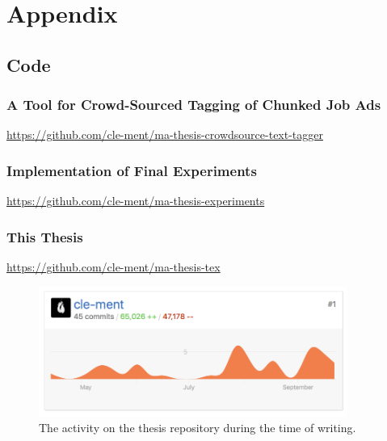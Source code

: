 
\renewcommand{\theequation}{B\arabic{equation}}
\setcounter{equation}{0}
\renewcommand{\thefigure}{B\arabic{figure}}
\setcounter{figure}{0}
\renewcommand{\thetable}{B\arabic{table}}
\setcounter{table}{0}


\clearpage

\thesisappendix

\section{Appendix}

\subsection{Code}

\subsubsection*{A Tool for Crowd-Sourced Tagging of Chunked Job Ads}
\label{sub:A Tool for Crowd-Sourced Tagging of Chunked Job Ads}

\url{https://github.com/cle-ment/ma-thesis-crowdsource-text-tagger}

\subsubsection*{Implementation of Final Experiments}
\label{sub:Implementation of Final Experiments}


\url{https://github.com/cle-ment/ma-thesis-experiments}

\subsubsection*{This Thesis}
\label{sub:This Thesis}

\url{https://github.com/cle-ment/ma-thesis-tex}

\begin{figure}[h]
  \centering
  \includegraphics[width=0.9\textwidth]{img/git-tex.png}
  \caption{The activity on the thesis repository during the time of writing.}
\label{fig:git repo activity}
\end{figure}


